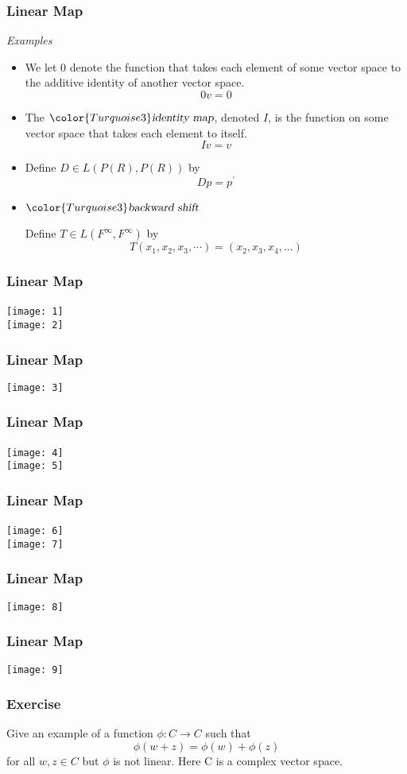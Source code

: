 \documentclass[12pt, t]{beamer}
\renewcommand{\emph}[1]{{\color{Turquoise3}\textsl{#1}}}
\newcommand{\nullspace}{~\\[15pt]}
\begin{document}
\begin{frame}
    \frametitle{Linear Map}
    \emph{Examples}
    \begin{itemize}
        \item  We let 0 denote the function that takes each element of some vector space to the additive identity of another vector space.
        \[
        0v=0    
        \]
        \item The $\emph{identity map}$, denoted $I$, is the function on some vector space that takes each element to itself. 
         \[
         Iv=v
         \]
         \item Define $D \in L(P(R),P(R)) $ by
         \[
         Dp=p^{'}    
         \]
    
         \item $\emph{backward shift}$
         
         Define $T \in L(F^{\infty},F^{\infty}) $ by
         \[
         T(x_1,x_2,x_3,\cdots)=(x_2,x_3,x_4,...)    
         \]
    \end{itemize}
\end{frame}

\begin{frame}
    \frametitle{Linear Map}
    \texttt{[image: 1]}
    \nullspace
    \texttt{[image: 2]}
\end{frame}

\begin{frame}
    \frametitle{Linear Map}
    \texttt{[image: 3]}
\end{frame}

\begin{frame}
    \frametitle{Linear Map}
    \texttt{[image: 4]}
    \nullspace
    \texttt{[image: 5]}
\end{frame}

\begin{frame}
    \frametitle{Linear Map}
    \texttt{[image: 6]}
    \nullspace
    \texttt{[image: 7]}
\end{frame}
\begin{frame}
    \frametitle{Linear Map}
    \texttt{[image: 8]}
\end{frame}

\begin{frame}
    \frametitle{Linear Map}
    \texttt{[image: 9]}
\end{frame}
\begin{frame}
    \frametitle{Exercise}
    Give an example of a function $\phi: C\rightarrow C$ such that
    \[
    \phi (w+z)=\phi(w)+\phi(z)    
    \]
    for all $w,z \in C$ but $\phi$ is not linear. Here C is a complex vector space.
\end{frame}
\end{document}
